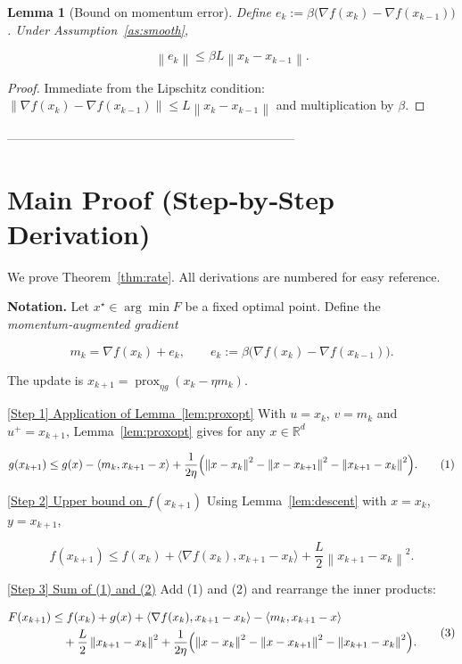 \documentclass{article}
\newtheorem{lemma}{Lemma}
\newcommand{\prox}{\operatorname{prox}}
\newcommand{\R}{\mathbb{R}}
\newcommand{\norm}[1]{\left\lVert #1\right\rVert}
\newcommand{\inner}[2]{\langle #1,#2\rangle}
\newcommand{\grad}{\nabla}
\begin{document}
\begin{lemma}[Bound on momentum error]\label{lem:error}
Define $e_k:=\beta\bigl(\grad f(x_k)-\grad f(x_{k-1})\bigr)$.  
Under Assumption~\ref{as:smooth},

\[
\norm{e_k}\le \beta L \norm{x_k-x_{k-1}} .
\]
\end{lemma}
\begin{proof}
Immediate from the Lipschitz condition:
$\norm{\grad f(x_k)-\grad f(x_{k-1})}\le L\norm{x_k-x_{k-1}}$ and multiplication by $\beta$. \qedhere
\end{proof}

---------------------------------------------------------------------

\section*{Main Proof (Step‑by‑Step Derivation)}
We prove Theorem~\ref{thm:rate}.  
All derivations are numbered for easy reference.

\medskip
\noindent\textbf{Notation.}  
Let $x^\star\in\arg\min F$ be a fixed optimal point.  
Define the \emph{momentum‑augmented gradient}  

\[
m_k = \grad f(x_k)+e_k,\qquad e_k:=\beta\bigl(\grad f(x_k)-\grad f(x_{k-1})\bigr).
\]

The update is $x_{k+1}= \prox_{\eta g}(x_k-\eta m_k)$.

\medskip

\noindent\underline{[Step 1] Application of Lemma~\ref{lem:proxopt}}  
With $u=x_k$, $v=m_k$ and $u^{+}=x_{k+1}$, Lemma~\ref{lem:proxopt} gives for any $x\in\R^{d}$  

\[
g(x_{k+1})\le g(x)-\inner{m_k}{x_{k+1}-x}
+\frac{1}{2\eta}\Bigl(\norm{x-x_k}^{2}
-\norm{x-x_{k+1}}^{2}
-\norm{x_{k+1}-x_k}^{2}\Bigr).
\tag{1}
\]

\noindent\underline{[Step 2] Upper bound on $f(x_{k+1})$}  
Using Lemma~\ref{lem:descent} with $x=x_k$, $y=x_{k+1}$,

\[
f(x_{k+1})\le f(x_k)+\inner{\grad f(x_k)}{x_{k+1}-x_k}
+\frac{L}{2}\norm{x_{k+1}-x_k}^{2}.
\tag{2}
\]

\noindent\underline{[Step 3] Sum of (1) and (2)}  
Add (1) and (2) and rearrange the inner products:

\[
\begin{aligned}
F(x_{k+1}) &\le f(x_k)+g(x)
+\inner{\grad f(x_k)}{x_{k+1}-x_k}
-\inner{m_k}{x_{k+1}-x}
\\
&\quad+\frac{L}{2}\norm{x_{k+1}-x_k}^{2}
+\frac{1}{2\eta}\Bigl(\norm{x-x_k}^{2}
-\norm{x-x_{k+1}}^{2}
-\norm{x_{k+1}-x_k}^{2}\Bigr).
\end{aligned}
\tag{3}
\]
\end{document}
